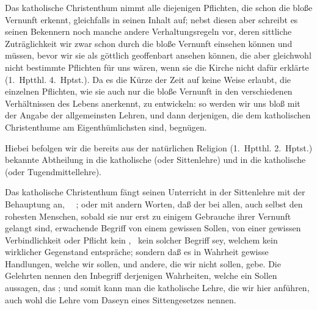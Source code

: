\clearpage%
\begin{aufza}
\item Das katholische Christenthum nimmt alle diejenigen Pflichten, die schon die bloße Vernunft erkennt, gleichfalls in seinen Inhalt auf; nebst diesen aber schreibt es seinen Bekennern noch manche andere Verhaltungsregeln vor, deren sittliche Zuträglichkeit wir zwar schon durch die bloße Vernunft einsehen können und müssen, bevor wir sie als göttlich geoffenbart ansehen können, die aber gleichwohl nicht bestimmte Pflichten für uns wären, wenn sie die Kirche nicht dafür erklärte (1.~Hptthl. 4.~Hptst.). Da es die Kürze der Zeit auf keine Weise erlaubt, die einzelnen Pflichten, wie sie auch nur die bloße Vernunft in den verschiedenen Verhältnissen des Lebens anerkennt, zu entwickeln: so werden wir uns bloß mit der Angabe der allgemeinsten Lehren, und dann derjenigen, die dem katholischen Christenthume am Eigenthümlichsten sind, begnügen.
\item Hiebei befolgen wir die bereits aus der natürlichen Religion (1.~Hptthl. 2.~Hptst.) bekannte Abtheilung in die katholische  (oder Sittenlehre) und in die katholische  (oder Tugendmittellehre).
\end{aufza}

Das katholische Christenthum fängt seinen Unterricht in der Sittenlehre mit der Behauptung an, ~\ ; oder mit andern Worten, daß der bei allen, auch selbst den rohesten Menschen, sobald sie nur erst zu einigem Gebrauche ihrer Vernunft gelangt sind, erwachende Begriff von einem gewissen Sollen, von einer gewissen Verbindlichkeit oder Pflicht kein , \dh\  kein solcher Begriff sey, welchem kein wirklicher Gegenstand entspräche; sondern daß es in Wahrheit gewisse Handlungen, welche wir sollen, und andere, die wir nicht sollen, gebe. Die Gelehrten nennen den Inbegriff derjenigen Wahrheiten, welche ein Sollen aussagen, das ; und somit kann man die katholische Lehre, die wir hier anführen, auch wohl die Lehre vom Daseyn eines Sittengesetzes nennen.

